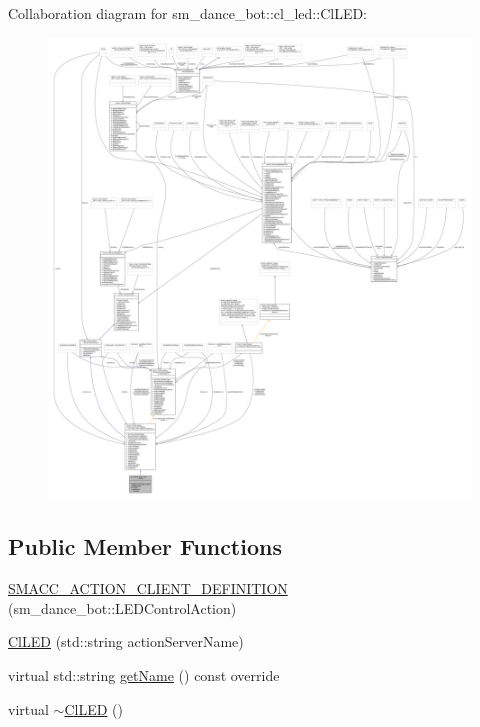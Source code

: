 Collaboration diagram for sm\+\_\+dance\+\_\+bot\+:\+:cl\+\_\+led\+:\+:Cl\+L\+ED\+:
\nopagebreak
\begin{figure}[H]
\begin{center}
\leavevmode
\includegraphics[width=350pt]{classsm__dance__bot_1_1cl__led_1_1ClLED__coll__graph}
\end{center}
\end{figure}
\subsection*{Public Member Functions}
\begin{DoxyCompactItemize}
\item 
\hyperlink{classsm__dance__bot_1_1cl__led_1_1ClLED_ab147c1770ddc2fad333427ae9f909011}{S\+M\+A\+C\+C\+\_\+\+A\+C\+T\+I\+O\+N\+\_\+\+C\+L\+I\+E\+N\+T\+\_\+\+D\+E\+F\+I\+N\+I\+T\+I\+ON} (sm\+\_\+dance\+\_\+bot\+::\+L\+E\+D\+Control\+Action)
\item 
\hyperlink{classsm__dance__bot_1_1cl__led_1_1ClLED_a5ef372c6230f1a3eb2dcd85f715b60b0}{Cl\+L\+ED} (std\+::string action\+Server\+Name)
\item 
virtual std\+::string \hyperlink{classsm__dance__bot_1_1cl__led_1_1ClLED_aa0a9fb92df96fb1bbba35c78fbe4119d}{get\+Name} () const override
\item 
virtual \hyperlink{classsm__dance__bot_1_1cl__led_1_1ClLED_add9ff40d28e1d31d77e1a2ff92e79fd2}{$\sim$\+Cl\+L\+ED} ()
\end{DoxyCompactItemize}
